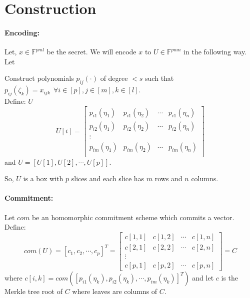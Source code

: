 \section{Construction}
\paragraph{Encoding:}
Let, $x\in \mathbb{F}^{pml}$ %
be the secret. We will encode $x$ to $U\in \mathbb{F}^{pmn}$ in the following way.\\
Let


Construct polynomials $p_{ij}(\cdot)$ %
of degree $< s$ such that 
$ p_{ij}(\zeta_k)=x_{ijk} ~~\forall i\in [p], j\in [m], k\in [l]$.\\
Define:  $U$ %
$$U[i]=
\begin{bmatrix}
	p_{i1}(\eta_1) & p_{i1}(\eta_2) & \cdots & p_{i1}(\eta_n)\\
	p_{i2}(\eta_1) & p_{i2}(\eta_2) & \cdots & p_{i2}(\eta_n)\\
	\vdots\\
	p_{im}(\eta_1) & p_{im}(\eta_2) & \cdots & p_{im}(\eta_n)\\
\end{bmatrix}
$$
and $U=[U[1], U[2], \cdots, U[p]]$.

So, $U$ is a box with $p$ slices and each slice has $m$ rows and $n$ columns.

\paragraph{Commitment:} Let $com$ be an homomorphic commitment scheme which commits a vector. Define:
$$com(U)= [c_1,c_2,\cdots , c_p]^T=
 \begin{bmatrix} 
c[1,1] & c[1,2] & \cdots & c[1,n] \\
c[2,1] & c[2,2] & \cdots & c[2,n] \\
\vdots\\
c[p,1] & c[p,2] & \cdots & c[p,n]
\end{bmatrix}
=C$$
where $c[i,k]=com([p_{i1}(\eta_k),p_{i2}(\eta_k),\cdots , p_{im}(\eta_k)]^T)$ and let $c$ is the Merkle tree root of $C$ where leaves are columns of $C$.


